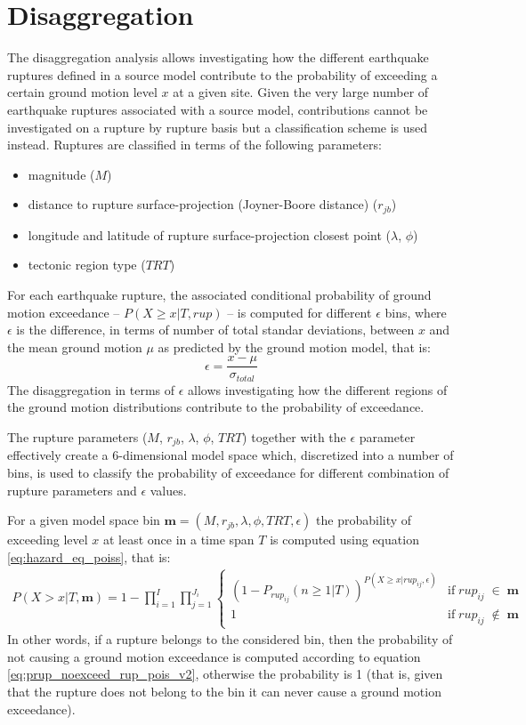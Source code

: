 \section{Disaggregation}
The disaggregation analysis allows investigating how the different earthquake ruptures defined in a source model
contribute to the probability of exceeding a certain ground motion level $x$ at a given site. Given the very
large number of earthquake ruptures associated with a source model, contributions cannot be investigated on a rupture by
rupture basis but a classification scheme is used instead. Ruptures are classified in terms of the following parameters:
\begin{itemize}
	\item magnitude ($M$)
	\item distance to rupture surface-projection (Joyner-Boore distance) ($r_{jb}$)
	\item longitude and latitude of rupture surface-projection closest point ($\lambda$, $\phi$)
	\item tectonic region type ($TRT$)
\end{itemize}
For each earthquake rupture, the associated conditional probability of ground motion exceedance -- $P(X \ge x | T, rup)$ -- is computed
for different $\epsilon$ bins, where $\epsilon$ is the difference, in terms of number of total standar deviations,
between $x$ and the mean ground motion $\mu$ as predicted by the ground motion model, that is:
\begin{equation}
\epsilon = \frac{x - \mu}{\sigma_{total}}
\end{equation}
The disaggregation in terms of $\epsilon$ allows investigating how the different regions of the ground motion distributions
contribute to the probability of exceedance.

The rupture parameters ($M$, $r_{jb}$, $\lambda$, $\phi$, $TRT$) together with the $\epsilon$ parameter effectively
create a 6-dimensional model space which, discretized into a number of bins, is used to classify the probability
of exceedance for different combination of rupture parameters and $\epsilon$ values.

For a given model space bin $\bm{m} = (M, r_{jb}, \lambda, \phi, TRT, \epsilon)$ the probability of
exceeding level $x$ at least once in a time span $T$ is computed using equation \ref{eq:hazard_eq_poiss}, that is:
\begin{align}
\label{eq:disagg}
P(X > x | T, \bm{m}) =
	1 - \prod_{i=1}^{I}\prod_{j=1}^{J_{i}}
	\begin{cases} (1 - P_{rup_{ij}}(n \ge 1 | T))^{P(X \ge x | rup_{ij}, \epsilon)} & \mbox{if}\;rup_{ij}\;\in\;\bm{m}\\
			      1 & \mbox{if}\;rup_{ij}\;\notin\;\bm{m}
	\end{cases}
\end{align}
In other words, if a rupture belongs to the considered bin, then the probability of not causing a ground motion exceedance is computed
according to equation \ref{eq:prup_noexceed_rup_pois_v2}, otherwise the probability is 1 (that is, given that the rupture does not belong to the bin it can never cause a ground motion exceedance).

